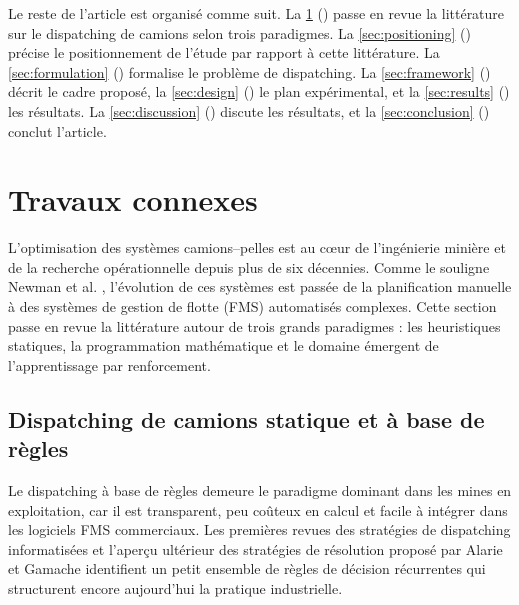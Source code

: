 \documentclass[11pt,a4paper]{article}
\begin{document}
Le reste de l'article est organisé comme suit. La \cref{sec:relwork} () passe en revue la littérature sur le dispatching de camions selon trois paradigmes. La \cref{sec:positioning} () précise le positionnement de l'étude par rapport à cette littérature. La \cref{sec:formulation} () formalise le problème de dispatching. La \cref{sec:framework} () décrit le cadre proposé, la \cref{sec:design} () le plan expérimental, et la \cref{sec:results} () les résultats. La \cref{sec:discussion} () discute les résultats, et la \cref{sec:conclusion} () conclut l'article.

\section{Travaux connexes}
\label{sec:relwork}

L'optimisation des systèmes camions--pelles est au c\oe ur de l'ingénierie minière et de la recherche opérationnelle depuis plus de six décennies. Comme le souligne Newman et al. \cite{AlexandraNewman2010}, l'évolution de ces systèmes est passée de la planification manuelle à des systèmes de gestion de flotte (FMS) automatisés complexes. Cette section passe en revue la littérature autour de trois grands paradigmes : les heuristiques statiques, la programmation mathématique et le domaine émergent de l'apprentissage par renforcement.

\subsection{Dispatching de camions statique et à base de règles}

Le dispatching à base de règles demeure le paradigme dominant dans les mines en exploitation, car il est transparent, peu coûteux en calcul et facile à intégrer dans les logiciels FMS commerciaux. Les premières revues des stratégies de dispatching informatisées \cite{MohanMunirathinam1994} et l'aperçu ultérieur des stratégies de résolution proposé par Alarie et Gamache \cite{Alarie2002} identifient un petit ensemble de règles de décision récurrentes qui structurent encore aujourd'hui la pratique industrielle.
\end{document}
